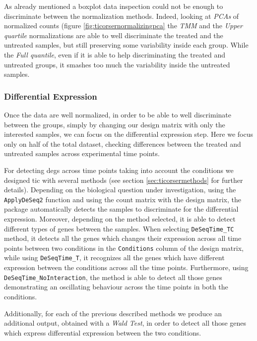 As already mentioned a boxplot data inspection could not be enough to discriminate between the normalization methods. 
Indeed, looking at \textit{PCAs} of normalized counts (figure \ref{fig:ticorsernormalizingpca} the \textit{TMM} and the \textit{Upper quartile} normalizations are able to well discriminate the treated and the untreated samples, but still preserving some variability inside each group.
While the \textit{Full quantile}, even if it is able to help discriminating the treated and untreated groups, it smashes too much the variability inside the untreated samples.



\subsubsection{Differential Expression}
Once the data are well normalized, in order to be able to well discriminate between the groups, simply by changing our design matrix with only the interested samples, we can focus on the differential expression step.
Here we focus only on half of the total dataset, checking differences between the treated and untreated samples across experimental time points.

For detecting \glspl{deg} across time points taking into account the conditions we designed \gls{tic} with several methods (see section \ref{sec:ticorsermethods} for further details).
Depending on the biological question under investigation, using the \lstinline!ApplyDeSeq2! function and using the count matrix with the design matrix, the package automatically detects the samples to discriminate for the differential expression.
Moreover, depending on the method selected, it is able to detect different types of genes between the samples.
When selecting \lstinline!DeSeqTime_TC! method, it detects all the genes which changes their expression across all time points between two conditions in the \lstinline!Conditions! column of the design matrix, while using \lstinline!DeSeqTime_T!, it recognizes all the genes which have different expression between the conditions across all the time points. 
Furthermore, using \lstinline!DeSeqTime_NoInteraction!, the method is able to detect all those genes demonstrating an oscillating behaviour across the time points in both the conditions.

Additionally, for each of the previous described methods we produce an additional output, obtained with a \textit{Wald Test}, in order to detect all those genes which express differential expression between	the two conditions.

